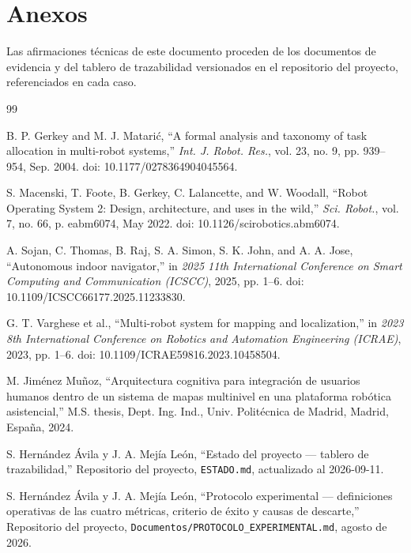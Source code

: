 \documentclass[12pt,letterpaper]{article}
\begin{document}
\section*{Anexos}

Las afirmaciones técnicas de este documento proceden de los documentos de evidencia y del tablero de trazabilidad versionados en el repositorio del proyecto, referenciados en cada caso.

\begin{thebibliography}{99}

B. P. Gerkey and M. J. Matarić, ``A formal analysis and taxonomy of task allocation in multi-robot systems,'' \textit{Int. J. Robot. Res.}, vol. 23, no. 9, pp. 939--954, Sep. 2004. doi: 10.1177/0278364904045564.

S. Macenski, T. Foote, B. Gerkey, C. Lalancette, and W. Woodall, ``Robot Operating System 2: Design, architecture, and uses in the wild,'' \textit{Sci. Robot.}, vol. 7, no. 66, p. eabm6074, May 2022. doi: 10.1126/scirobotics.abm6074.

A. Sojan, C. Thomas, B. Raj, S. A. Simon, S. K. John, and A. A. Jose, ``Autonomous indoor navigator,'' in \textit{2025 11th International Conference on Smart Computing and Communication (ICSCC)}, 2025, pp. 1--6. doi: 10.1109/ICSCC66177.2025.11233830.

G. T. Varghese et al., ``Multi-robot system for mapping and localization,'' in \textit{2023 8th International Conference on Robotics and Automation Engineering (ICRAE)}, 2023, pp. 1--6. doi: 10.1109/ICRAE59816.2023.10458504.

M. Jiménez Muñoz, ``Arquitectura cognitiva para integración de usuarios humanos dentro de un sistema de mapas multinivel en una plataforma robótica asistencial,'' M.S. thesis, Dept. Ing. Ind., Univ. Politécnica de Madrid, Madrid, España, 2024.

S. Hernández Ávila y J. A. Mejía León, ``Estado del proyecto --- tablero de trazabilidad,'' Repositorio del proyecto, \texttt{ESTADO.md}, actualizado al 2026-09-11.

S. Hernández Ávila y J. A. Mejía León, ``Protocolo experimental --- definiciones operativas de las cuatro métricas, criterio de éxito y causas de descarte,'' Repositorio del proyecto, \texttt{Documentos/PROTOCOLO\_EXPERIMENTAL.md}, agosto de 2026.


\end{thebibliography}
\end{document}
